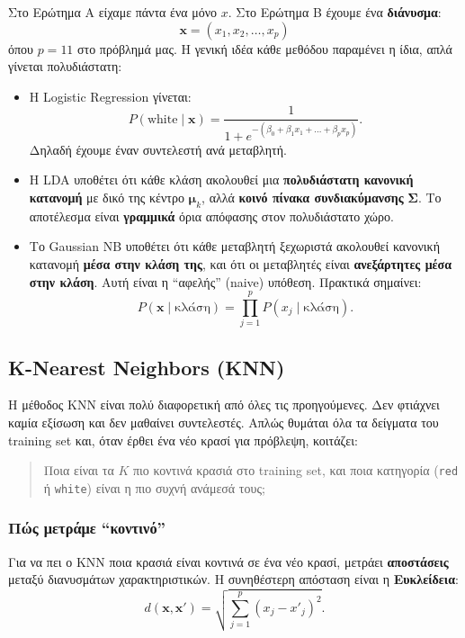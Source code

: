 \documentclass[11pt,a4paper]{article}
\newcommand{\code}[1]{\texttt{#1}}
\newcommand{\eng}[1]{\textenglish{#1}}
\begin{document}
Στο Ερώτημα Α είχαμε πάντα ένα μόνο \(x\). Στο Ερώτημα Β έχουμε ένα
\textbf{διάνυσμα}:
\[
\mathbf{x} = (x_1, x_2, \dots, x_p)
\]
όπου \(p=11\) στο πρόβλημά μας. Η γενική ιδέα κάθε μεθόδου παραμένει η
ίδια, απλά γίνεται πολυδιάστατη:
\begin{itemize}
    \item Η Logistic Regression γίνεται:
    \[
    P(\text{white} \mid \mathbf{x}) =
    \frac{1}{1 + e^{-(\beta_0 + \beta_1 x_1 + \dots + \beta_p x_p)}}.
    \]
    Δηλαδή έχουμε έναν συντελεστή ανά μεταβλητή.

    \item Η LDA υποθέτει ότι κάθε κλάση ακολουθεί μια
    \textbf{πολυδιάστατη κανονική κατανομή} με δικό της κέντρο
    \(\boldsymbol{\mu}_k\), αλλά \textbf{κοινό πίνακα συνδιακύμανσης}
    \(\boldsymbol{\Sigma}\). Το αποτέλεσμα είναι \textbf{γραμμικά} όρια
    απόφασης στον πολυδιάστατο χώρο.

    \item Το Gaussian NB υποθέτει ότι κάθε μεταβλητή ξεχωριστά ακολουθεί
    κανονική κατανομή \textbf{μέσα στην κλάση της}, και ότι οι μεταβλητές
    είναι \textbf{ανεξάρτητες μέσα στην κλάση}. Αυτή είναι η ``αφελής''
    (\eng{naive}) υπόθεση. Πρακτικά σημαίνει:
    \[
    P(\mathbf{x} \mid \text{κλάση}) =
    \prod_{j=1}^{p} P(x_j \mid \text{κλάση}).
    \]
\end{itemize}

\subsection{K-Nearest Neighbors (KNN)}

Η μέθοδος KNN είναι πολύ διαφορετική από όλες τις προηγούμενες. Δεν
φτιάχνει καμία εξίσωση και δεν μαθαίνει συντελεστές. Απλώς θυμάται όλα τα
δείγματα του training set και, όταν έρθει ένα νέο κρασί για πρόβλεψη,
κοιτάζει:
\begin{quote}
Ποια είναι τα \(K\) πιο κοντινά κρασιά στο training set, και ποια
κατηγορία (\code{red} ή \code{white}) είναι η πιο συχνή ανάμεσά τους;
\end{quote}

\subsubsection{Πώς μετράμε ``κοντινό''}

Για να πει ο KNN ποια κρασιά είναι κοντινά σε ένα νέο κρασί, μετράει
\textbf{αποστάσεις} μεταξύ διανυσμάτων χαρακτηριστικών. Η συνηθέστερη
απόσταση είναι η \textbf{Ευκλείδεια}:
\[
d(\mathbf{x}, \mathbf{x}') =
\sqrt{\sum_{j=1}^{p} (x_j - x'_j)^2}.
\]
\end{document}
